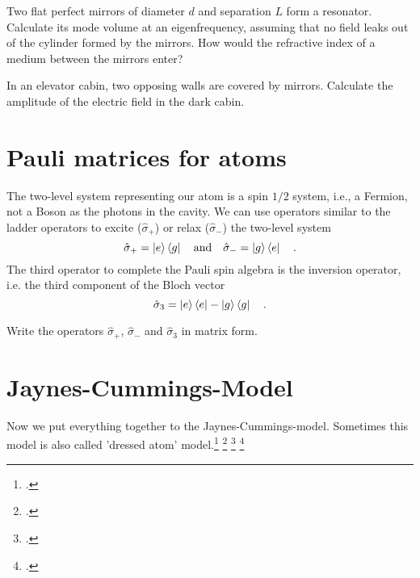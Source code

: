 \begin{questions}
\item Two flat perfect mirrors of diameter $d$ and separation $L$ form a resonator. Calculate its mode volume at an eigenfrequency, assuming that no field leaks out of the cylinder formed by the mirrors. How would the refractive index of a medium between the mirrors enter?

\item In an elevator cabin, two opposing walls  are covered by mirrors. Calculate the amplitude of the electric field in the dark cabin. 
\end{questions}



\section{Pauli matrices for atoms}

The two-level system representing our atom is a spin $1/2$ system, i.e., a Fermion, not a Boson as the photons in the cavity. We can use operators similar to the ladder operators to excite ($\hat{\sigma}_+$) or relax ($\hat{\sigma}_-$) the two-level system
\begin{equation}
 \hat{\sigma}_+ = \ket{e} \bra{g} \quad \text{and} \quad 
  \hat{\sigma}_- = \ket{g} \bra{e} \quad .
\end{equation}
The third operator to complete the Pauli spin algebra is the inversion operator, i.e. the third component of the Bloch vector
\begin{equation}
 \hat{\sigma}_3 = \ket{e} \bra{e} - \ket{g} \bra{g} \quad .
\end{equation} 

\begin{questions}
\item Write the operators  $  \hat{\sigma}_+$, $  \hat{\sigma}_-$ and 
$ \hat{\sigma}_3 $ in matrix form.
\end{questions}



\section{Jaynes-Cummings-Model}
Now we put everything together to  the Jaynes-Cummings-model. Sometimes this model is also called 'dressed atom' model.\footcite[chap. 6.8]{Rand2016} \footcite[chap. 4.5]{GerryKnight2005} \footcite[chap. 10.4]{Fox}  \footcite[chap. 3.4]{HarocheRaimond2006}

